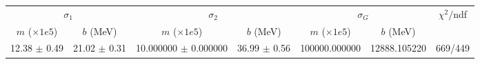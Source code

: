 \begin{tabular}{cc|cc|cc||c}
\multicolumn{2}{c|}{$\sigma_1$} & \multicolumn{2}{|c}{$\sigma_2$} & \multicolumn{2}{|c}{$\sigma_G$}  & \multirow{2}{*}{$\chi^2/$ndf}\\
$m$ ($\times1e5$) & $b$ (MeV) & $m$ ($\times1e5$) & $b$ (MeV) & $m$ ($\times1e5$) & $b$ (MeV) & \\
\hline
12.38 $\pm$ 0.49 & 21.02 $\pm$ 0.31 & 10.000000 $\pm$ 0.000000 & 36.99 $\pm$ 0.56 & 100000.000000 & 12888.105220 & 669/449\\
\end{tabular}
